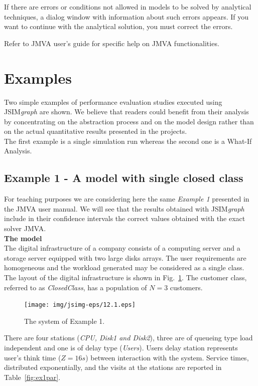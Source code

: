 If there are errors or conditions not allowed in models to be
solved by analytical techniques, a dialog window with information
about such errors appears. If you want to continue with the
analytical solution, you must correct the errors.

Refer to JMVA user's guide for specific help on JMVA
functionalities.\\

\section{Examples}
Two simple examples of performance evaluation studies executed
using JSIM\emph{graph} are shown. We believe that readers could
benefit from their analysis by concentrating on the abstraction
process and on the model design rather than on the actual
quantitative results presented in the projects.\\
The first example is a single simulation run whereas the second
one is a What-If Analysis.

\subsection{Example 1 - A model with single closed class}
For teaching purposes we are considering here the same
\emph{Example 1} presented in the JMVA user manual. We will see
that the results obtained with JSIM\emph{graph} include in their
confidence intervals the correct values obtained with the exact
solver JMVA.\\

\noindent \textbf{The model}\\
The digital infrastructure of a company consists of a computing
server and a storage server equipped with two large disks arrays.
The user requirements are homogeneous and the workload generated
may be considered as a single class. The layout of the digital
infrastructure is shown in Fig.~\ref{fig:ex1layout}. The customer
class, referred to as \emph{ClosedClass}, has a population of
$N=3$ customers.
\begin{figure}[htb]
    \begin{center}
        \texttt{[image: img/jsimg-eps/12.1.eps]}
    \end{center}
    \caption{The system of Example 1.}
    \label{fig:ex1layout}
\end{figure}
There are four stations (\emph{CPU, Disk1 and Disk2}), three are
of queueing type load independent and one is of delay type
(\emph{Users}). Users delay station represents user's think time
($Z=16s$) between interaction with the system. Service times,
distributed exponentially, and the visits at the stations are
reported in Table~\ref{fig:ex1par}.\\

